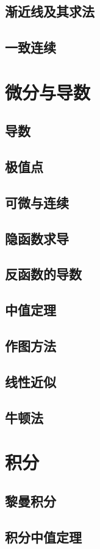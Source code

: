 \documentclass[12pt,a4paper,UTF8]{ctexbook}
\theoremstyle{plain}
\begin{document}
\section{渐近线及其求法}
\section{一致连续}

\chapter{微分与导数}
\section{导数}
\section{极值点}
\section{可微与连续}
\section{隐函数求导}
\section{反函数的导数}
\section{中值定理}
\section{作图方法}
\section{线性近似}
\section{牛顿法}


\chapter{积分}
\section{黎曼积分}
\section{积分中值定理}
\end{document}
